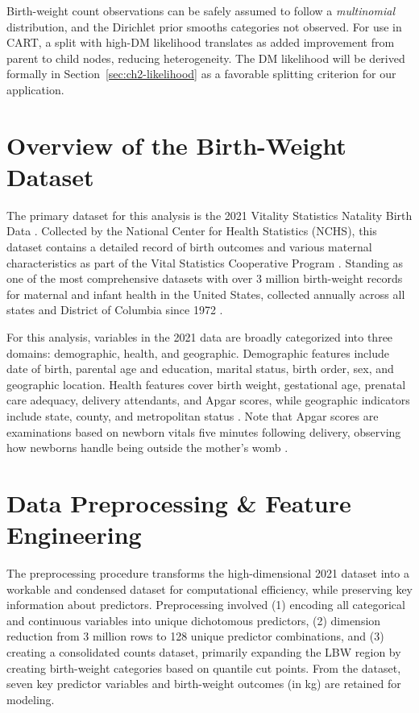 Birth-weight count observations can be safely assumed to follow a \emph{multinomial} distribution, and the Dirichlet prior smooths categories not observed. For use in CART, a split with high-DM likelihood translates as added improvement from parent to child nodes, reducing heterogeneity. The DM likelihood will be derived formally in Section~\ref{sec:ch2-likelihood} as a favorable splitting criterion for our application. 

\section{Overview of the Birth-Weight Dataset}
\label{sec:ch2-introduction}

The primary dataset for this analysis is the 2021 Vitality Statistics Natality Birth Data \parencite{nber_birth_data}. Collected by the National Center for Health Statistics (NCHS), this dataset contains a detailed record of birth outcomes and various maternal characteristics as part of the Vital Statistics Cooperative Program \parencite{jain2024, nber_birth_data}. Standing as one of the most comprehensive datasets with over 3 million birth-weight records for maternal and infant health in the United States, collected annually across all states and District of Columbia since 1972 \parencite{nber_birth_data}.

For this analysis, variables in the 2021 data are broadly categorized into three domains: demographic, health, and geographic. Demographic features include date of birth, parental age and education, marital status, birth order, sex, and geographic location. Health features cover birth weight, gestational age, prenatal care adequacy, delivery attendants, and Apgar scores, while geographic indicators include state, county, and metropolitan  status \parencite{nber_birth_data}. Note that Apgar scores are examinations based on newborn vitals five minutes following delivery, observing how newborns handle being outside the mother's womb \parencite{apgar_score}.

\section{Data Preprocessing \& Feature Engineering}
\label{sec:ch2-preprocessing}

The preprocessing procedure transforms the high-dimensional 2021 dataset into a workable and condensed dataset for computational efficiency, while preserving key information about predictors. Preprocessing involved (1) encoding all categorical and continuous variables into unique dichotomous predictors, (2) dimension reduction from 3 million rows to 128 unique predictor combinations, and (3) creating a consolidated counts dataset, primarily expanding the LBW region by creating birth-weight categories based on quantile cut points. From the dataset, seven key predictor variables and birth-weight outcomes (in kg) are retained for modeling. 

